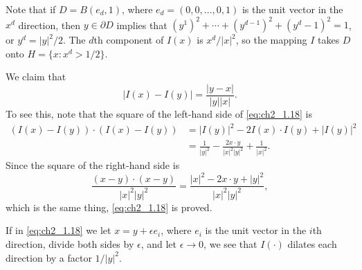 Note that if $D = B(e_d,1)$, where $e_d = (0,0,\ldots,0,1)$ is the unit vector in the $x^d$ direction, then $y \in \partial D$ implies that $(y^1)^2 + \cdots + (y^{d-1})^2 + (y^d - \allowbreak 1)^2 = 1$, or $y^d = |y|^2/2$. The $d$th component of $I(x)$ is $x^d/|x|^2$, so the mapping $I$ takes $D$ onto $H = \{x : x^d > 1/2\}$.

We claim that
\begin{equation}\label{eq:ch2_1.18}
    |I(x) - I(y)| = \frac{|y-x|}{|y||x|}.
\end{equation}
To see this, note that the square of the left-hand side of \eqref{eq:ch2_1.18} is
\begin{align*}
    (I(x) - I(y)) \cdot (I(x) - I(y)) &= |I(y)|^2 - 2I(x) \cdot I(y) + |I(y)|^2 \\
    &= \frac{1}{|y|^2} - \frac{2x \cdot y}{|x|^2|y|^2} + \frac{1}{|x|^2}.
\end{align*}
Since the square of the right-hand side is
\[
    \frac{(x-y) \cdot (x-y)}{|x|^2|y|^2} = \frac{|x|^2 - 2x \cdot y + |y|^2}{|x|^2|y|^2},
\]
which is the same thing, \eqref{eq:ch2_1.18} is proved.

If in \eqref{eq:ch2_1.18} we let $x = y + \epsilon e_i$, where $e_i$ is the unit vector in the $i$th direction, divide both sides by $\epsilon$, and let $\epsilon \to 0$, we see that $I(\cdot)$ dilates each direction by a factor $1/|y|^2$.

